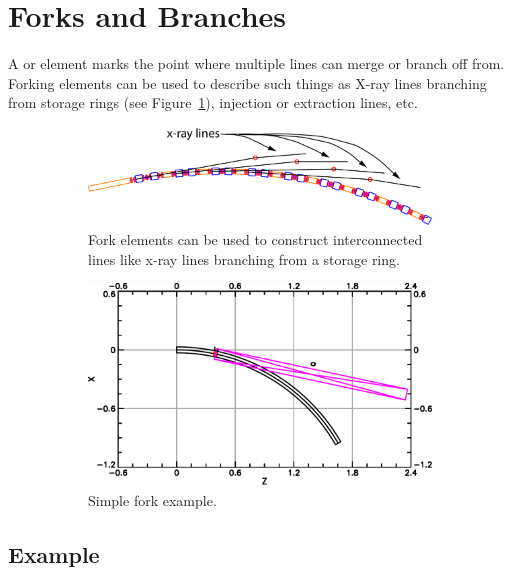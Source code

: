 \documentclass{hitec}     %
\newcommand{\Section}[1]{\section{#1}\vspace*{-1ex}}
\begin{document}
\newpage

\Section{Forks and Branches}
\label{s:fork}

A  or  element marks the point where multiple lines can merge or branch off
from. Forking elements can be used to describe such things as X-ray lines branching from storage
rings (see Figure~\ref{f:fork}), injection or extraction lines, etc.

\begin{figure}[tb]
  \centering
  \begin{subfigure}[t]{0.48\textwidth}
    \includegraphics[width=\textwidth]{x-fork.pdf}
    \caption{Fork elements can be used to construct interconnected lines like x-ray lines branching
      from a storage ring.}
    \label{f:fork}
  \end{subfigure}
  \hfil
  \begin{subfigure}[t]{0.48\textwidth}
    \includegraphics[width=\textwidth]{fork-example.pdf}
    \caption{Simple fork example.}
    \label{f:fork.example}
  \end{subfigure}
  \caption{}
\end{figure}

\subsection{Example}
\end{document}
